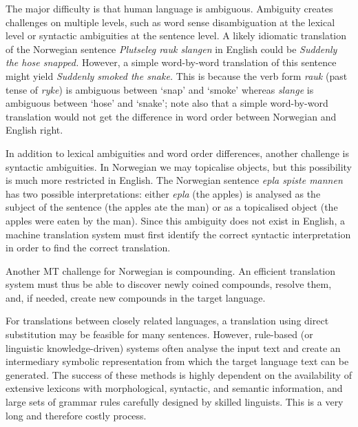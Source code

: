 \begin{multicols}{2}
The major difficulty is that human language is ambiguous. Ambiguity creates challenges on multiple levels, such as word sense disambiguation at the lexical level or syntactic ambiguities at the sentence level. 
A likely idiomatic translation of the Norwegian sentence \textit{Plutseleg rauk slangen} in English could be \textit{Suddenly the hose snapped.}
However, a simple word-by-word translation of this sentence might yield \textit{Suddenly smoked the snake.}
This is because the verb form \textit{rauk} (past tense of \textit{ryke}) is ambiguous between `snap' and `smoke' whereas \textit{slange} is ambiguous between `hose' and `snake'; note also that a simple word-by-word translation would not get the difference in word order between Norwegian and English right.

In addition to lexical ambiguities and word order differences, another challenge is syntactic ambiguities. 
In Norwegian we may topicalise objects, but this possibility is much more restricted in English. 
The Norwegian sentence \textit{epla spiste mannen} has two possible interpretations: either \textit{epla} (the apples) is analysed as the subject of the sentence (the apples ate the man) or as a topicalised object (the apples were eaten by the man). 
Since this ambiguity does not exist in English, a machine translation system must first identify the correct syntactic interpretation in order to find the correct translation. 

Another MT challenge for Norwegian is compounding. 
An efficient translation system must thus be able to discover newly coined compounds, resolve them, and, if needed, create new compounds in the target language. 

For translations between closely related languages, a translation using direct substitution may be feasible for many sentences. However, rule-based (or linguistic knowledge-driven) systems often analyse the input text and create an intermediary symbolic representation from which the target language text can be generated. The success of these methods is highly dependent on the availability of extensive lexicons with morphological, syntactic, and semantic information, and large sets of grammar rules carefully designed by skilled linguists. This is a very long and therefore costly process.


\end{multicols}
